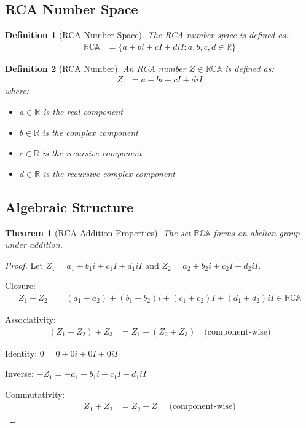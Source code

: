 \documentclass[12pt,a4paper]{article}
\newtheorem{definition}{Definition}
\newtheorem{theorem}{Theorem}
\begin{document}
\subsection{RCA Number Space}

\begin{definition}[RCA Number Space]
The RCA number space is defined as:
\begin{align}
\mathbb{RCA} &= \{a + bi + cI + diI : a, b, c, d \in \mathbb{R}\}
\end{align}
\end{definition}

\begin{definition}[RCA Number]
An RCA number $Z \in \mathbb{RCA}$ is defined as:
\begin{align}
Z &= a + bi + cI + diI
\end{align}
where:
\begin{itemize}
\item $a \in \mathbb{R}$ is the real component
\item $b \in \mathbb{R}$ is the complex component
\item $c \in \mathbb{R}$ is the recursive component
\item $d \in \mathbb{R}$ is the recursive-complex component
\end{itemize}
\end{definition}

\subsection{Algebraic Structure}

\begin{theorem}[RCA Addition Properties]
The set $\mathbb{RCA}$ forms an abelian group under addition.
\end{theorem}

\begin{proof}
Let $Z_1 = a_1 + b_1i + c_1I + d_1iI$ and $Z_2 = a_2 + b_2i + c_2I + d_2iI$.

Closure:
\begin{align}
Z_1 + Z_2 &= (a_1 + a_2) + (b_1 + b_2)i + (c_1 + c_2)I + (d_1 + d_2)iI \in \mathbb{RCA}
\end{align}

Associativity:
\begin{align}
(Z_1 + Z_2) + Z_3 &= Z_1 + (Z_2 + Z_3) \quad \text{(component-wise)}
\end{align}

Identity: $0 = 0 + 0i + 0I + 0iI$

Inverse: $-Z_1 = -a_1 - b_1i - c_1I - d_1iI$

Commutativity:
\begin{align}
Z_1 + Z_2 &= Z_2 + Z_1 \quad \text{(component-wise)}
\end{align}
\end{proof}
\end{document}
